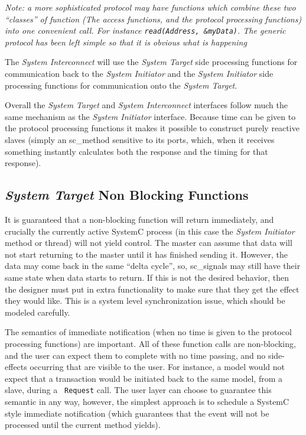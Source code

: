 \documentclass[12pt,oneside]{gsbook}
\newcommand{\master}{{\em System Initiator}\xspace}
\newcommand{\slave}{{\em System Target}\xspace}
\newcommand{\router}{{\em System Interconnect}\xspace}
\begin{document}
{\em Note: a more sophisticated protocol may have functions which
combine these two ``classes'' of function (The access functions, and the protocol
processing functions) into one convenient
call. For instance {\tt read(Address, \&myData)}. The generic protocol
has been left simple so that it is obvious what is happening }

The \router will use the \slave side processing functions for
communication back to the \master and the \master side processing
functions for communication onto the \slave.

Overall the \slave and \router interfaces follow much the same
mechanism as the \master interface. Because time can be given to the
protocol processing functions it
makes it possible to construct purely reactive slaves (simply an
sc\_method sensitive to its ports, which, when it receives something
instantly calculates both the response and the timing for that
response).

\subsection{\slave Non Blocking Functions}
It is guaranteed that a non-blocking function will return immediately, and crucially the currently
active SystemC process (in this case the \master method or thread) will not yield control. The
master can assume that data will not start returning to the master until it has finished sending
it. However, the data may come back in the same ``delta cycle'', so, sc\_signals may still have their
same state when data starts to return. If this is not the desired behavior, then the designer must
put in extra functionality to make sure that they get the effect they would like. This is a system
level synchronization issue, which should be modeled carefully.

The semantics of immediate notification (when no time is given to the
protocol processing functions) are important. All of these function
calls are non-blocking, and the user can expect them to complete with
no time passing, and no side-effects occurring that are visible to the
user. For instance, a model would not expect that a transaction would
be initiated back to the same model, from a slave, during a {\tt
Request} call. The user layer can choose to guarantee this semantic in
any way, however, the simplest approach is to schedule a SystemC style
immediate notification (which guarantees that the event will not be
processed until the current method yields).
\end{document}
